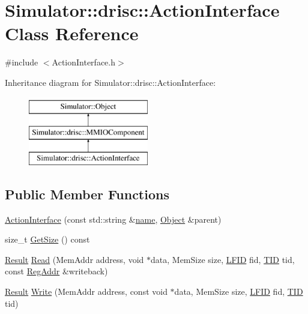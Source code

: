 \hypertarget{class_simulator_1_1drisc_1_1_action_interface}{\section{Simulator\+:\+:drisc\+:\+:Action\+Interface Class Reference}
\label{class_simulator_1_1drisc_1_1_action_interface}
}


{\ttfamily \#include $<$Action\+Interface.\+h$>$}

Inheritance diagram for Simulator\+:\+:drisc\+:\+:Action\+Interface\+:\begin{figure}[H]
\begin{center}
\leavevmode
\includegraphics[height=3.000000cm]{class_simulator_1_1drisc_1_1_action_interface}
\end{center}
\end{figure}
\subsection*{Public Member Functions}
\begin{DoxyCompactItemize}
\item 
\hyperlink{class_simulator_1_1drisc_1_1_action_interface_a57951db356b70d51aa258e83400b7ba3}{Action\+Interface} (const std\+::string \&\hyperlink{mtconf_8c_a8f8f80d37794cde9472343e4487ba3eb}{name}, \hyperlink{class_simulator_1_1_object}{Object} \&parent)
\item 
size\+\_\+t \hyperlink{class_simulator_1_1drisc_1_1_action_interface_ad821c373649b51707736c64e372fbd6d}{Get\+Size} () const 
\item 
\hyperlink{namespace_simulator_a4b6b5616e7236c0c131516a441776805}{Result} \hyperlink{class_simulator_1_1drisc_1_1_action_interface_aa0a8facc99c1fa6383dfe1cf6d4e0e52}{Read} (Mem\+Addr address, void $\ast$data, Mem\+Size size, \hyperlink{namespace_simulator_aaccbc706b2d6c99085f52f6dfc2333e4}{L\+F\+I\+D} fid, \hyperlink{namespace_simulator_a483cc4ecee1736e895054617672cded5}{T\+I\+D} tid, const \hyperlink{struct_simulator_1_1_reg_addr}{Reg\+Addr} \&writeback)
\item 
\hyperlink{namespace_simulator_a4b6b5616e7236c0c131516a441776805}{Result} \hyperlink{class_simulator_1_1drisc_1_1_action_interface_a31669c050dea3f850808553054a093b5}{Write} (Mem\+Addr address, const void $\ast$data, Mem\+Size size, \hyperlink{namespace_simulator_aaccbc706b2d6c99085f52f6dfc2333e4}{L\+F\+I\+D} fid, \hyperlink{namespace_simulator_a483cc4ecee1736e895054617672cded5}{T\+I\+D} tid)
\end{DoxyCompactItemize}


